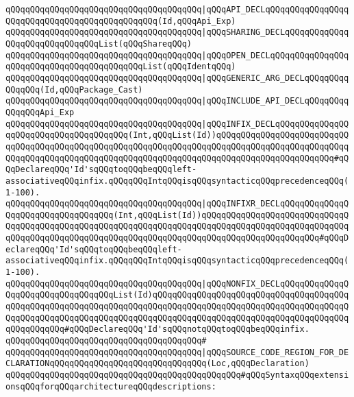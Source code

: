\verb|qQQqqQQqqQQqqQQqqQQqqQQqqQQqqQQqqQQqqQQq|\verb#|qQQqAPI_DECLqQQqqQQqqQQqqQQqqQQqqQQqqQQqqQQqqQQqqQQqqQQqqQQq(Id,qQQqApi_Exp)#\newline
\verb|qQQqqQQqqQQqqQQqqQQqqQQqqQQqqQQqqQQqqQQq|\verb#|qQQqSHARING_DECLqQQqqQQqqQQqqQQqqQQqqQQqqQQqqQQqList(qQQqShareqQQq)#\newline
\verb|qQQqqQQqqQQqqQQqqQQqqQQqqQQqqQQqqQQqqQQq|\verb#|qQQqOPEN_DECLqQQqqQQqqQQqqQQqqQQqqQQqqQQqqQQqqQQqqQQqqQQqList(qQQqIdentqQQq)#\newline
\verb|qQQqqQQqqQQqqQQqqQQqqQQqqQQqqQQqqQQqqQQq|\verb#|qQQqGENERIC_ARG_DECLqQQqqQQqqQQqqQQq(Id,qQQqPackage_Cast)#\newline
\verb|qQQqqQQqqQQqqQQqqQQqqQQqqQQqqQQqqQQqqQQq|\verb#|qQQqINCLUDE_API_DECLqQQqqQQqqQQqqQQqApi_Exp#\newline
\verb|qQQqqQQqqQQqqQQqqQQqqQQqqQQqqQQqqQQqqQQq|\verb#|qQQqINFIX_DECLqQQqqQQqqQQqqQQqqQQqqQQqqQQqqQQqqQQqqQQq(Int,qQQqList(Id))qQQqqQQqqQQqqQQqqQQqqQQqqQQqqQQqqQQqqQQqqQQqqQQqqQQqqQQqqQQqqQQqqQQqqQQqqQQqqQQqqQQqqQQqqQQqqQQqqQQqqQQqqQQqqQQqqQQqqQQqqQQqqQQqqQQqqQQqqQQqqQQqqQQqqQQqqQQqqQQqqQQq#\verb|#qQQqDeclareqQQq'Id'sqQQqtoqQQqbeqQQqleft-associativeqQQqinfix.qQQqqQQqIntqQQqisqQQqsyntacticqQQqprecedenceqQQq(1-100).|\newline
\verb|qQQqqQQqqQQqqQQqqQQqqQQqqQQqqQQqqQQqqQQq|\verb#|qQQqINFIXR_DECLqQQqqQQqqQQqqQQqqQQqqQQqqQQqqQQqqQQq(Int,qQQqList(Id))qQQqqQQqqQQqqQQqqQQqqQQqqQQqqQQqqQQqqQQqqQQqqQQqqQQqqQQqqQQqqQQqqQQqqQQqqQQqqQQqqQQqqQQqqQQqqQQqqQQqqQQqqQQqqQQqqQQqqQQqqQQqqQQqqQQqqQQqqQQqqQQqqQQqqQQqqQQqqQQqqQQq#\verb|#qQQqDeclareqQQq'Id'sqQQqtoqQQqbeqQQqleft-associativeqQQqinfix.qQQqqQQqIntqQQqisqQQqsyntacticqQQqprecedenceqQQq(1-100).|\newline
\verb|qQQqqQQqqQQqqQQqqQQqqQQqqQQqqQQqqQQqqQQq|\verb#|qQQqNONFIX_DECLqQQqqQQqqQQqqQQqqQQqqQQqqQQqqQQqqQQqList(Id)qQQqqQQqqQQqqQQqqQQqqQQqqQQqqQQqqQQqqQQqqQQqqQQqqQQqqQQqqQQqqQQqqQQqqQQqqQQqqQQqqQQqqQQqqQQqqQQqqQQqqQQqqQQqqQQqqQQqqQQqqQQqqQQqqQQqqQQqqQQqqQQqqQQqqQQqqQQqqQQqqQQqqQQqqQQqqQQqqQQqqQQqqQQqqQQq#\verb|#qQQqDeclareqQQq'Id'sqQQqnotqQQqtoqQQqbeqQQqinfix.|\newline
\verb|qQQqqQQqqQQqqQQqqQQqqQQqqQQqqQQqqQQqqQQq#|\newline
\verb|qQQqqQQqqQQqqQQqqQQqqQQqqQQqqQQqqQQqqQQq|\verb#|qQQqSOURCE_CODE_REGION_FOR_DECLARATIONqQQqqQQqqQQqqQQqqQQqqQQqqQQqqQQq(Loc,qQQqDeclaration)#\newline
\newline
\verb|qQQqqQQqqQQqqQQqqQQqqQQqqQQqqQQqqQQqqQQqqQQqqQQq#qQQqSyntaxqQQqextensionsqQQqforqQQqarchitectureqQQqdescriptions:|\newline
